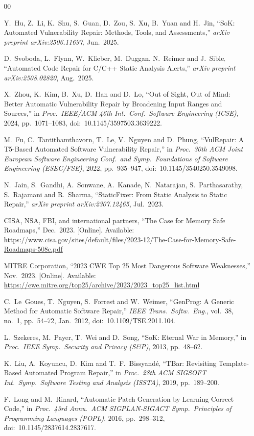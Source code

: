 \documentclass[conference]{IEEEtran}
\begin{document}
\begin{thebibliography}{00}

Y.~Hu, Z.~Li, K.~Shu, S.~Guan, D.~Zou, S.~Xu, B.~Yuan and H.~Jin,
``SoK: Automated Vulnerability Repair: Methods, Tools, and Assessments,''
\textit{arXiv preprint arXiv:2506.11697}, Jun.\ 2025.

D.~Svoboda, L.~Flynn, W.~Klieber, M.~Duggan, N.~Reimer and J.~Sible,
``Automated Code Repair for C/C++ Static Analysis Alerts,''
\textit{arXiv preprint arXiv:2508.02820}, Aug.\ 2025.

X.~Zhou, K.~Kim, B.~Xu, D.~Han and D.~Lo,
``Out of Sight, Out of Mind: Better Automatic Vulnerability Repair by Broadening
Input Ranges and Sources,''
in \textit{Proc.\ IEEE/ACM 46th Int.\ Conf.\ Software Engineering (ICSE)}, 2024,
pp.~1071--1083, doi:~10.1145/3597503.3639222.

M.~Fu, C.~Tantithamthavorn, T.~Le, V.~Nguyen and D.~Phung,
``VulRepair: A T5-Based Automated Software Vulnerability Repair,''
in \textit{Proc.\ 30th ACM Joint European Software Engineering Conf.\ and
Symp.\ Foundations of Software Engineering (ESEC/FSE)}, 2022,
pp.~935--947, doi:~10.1145/3540250.3549098.

N.~Jain, S.~Gandhi, A.~Sonwane, A.~Kanade, N.~Natarajan,
S.~Parthasarathy, S.~Rajamani and R.~Sharma,
``StaticFixer: From Static Analysis to Static Repair,''
\textit{arXiv preprint arXiv:2307.12465}, Jul.\ 2023.

CISA, NSA, FBI, and international partners,
``The Case for Memory Safe Roadmaps,'' Dec.\ 2023. [Online].
Available: \url{https://www.cisa.gov/sites/default/files/2023-12/The-Case-for-Memory-Safe-Roadmaps-508c.pdf}

MITRE Corporation,
``2023 CWE Top 25 Most Dangerous Software Weaknesses,'' Nov.\ 2023. [Online].
Available: \url{https://cwe.mitre.org/top25/archive/2023/2023_top25_list.html}

C.~Le~Goues, T.~Nguyen, S.~Forrest and W.~Weimer,
``GenProg: A Generic Method for Automatic Software Repair,''
\textit{IEEE Trans.\ Softw.\ Eng.}, vol.~38, no.~1, pp.~54--72, Jan.\ 2012,
doi:~10.1109/TSE.2011.104.

L.~Szekeres, M.~Payer, T.~Wei and D.~Song,
``SoK: Eternal War in Memory,''
in \textit{Proc.\ IEEE Symp.\ Security and Privacy (S\&P)}, 2013,
pp.~48--62.

K.~Liu, A.~Koyuncu, D.~Kim and T.~F.~Bissyand\'{e},
``TBar: Revisiting Template-Based Automated Program Repair,''
in \textit{Proc.\ 28th ACM SIGSOFT Int.\ Symp.\ Software Testing
and Analysis (ISSTA)}, 2019, pp.~189--200.

F.~Long and M.~Rinard,
``Automatic Patch Generation by Learning Correct Code,''
in \textit{Proc.\ 43rd Annu.\ ACM SIGPLAN-SIGACT Symp.\ Principles of
Programming Languages (POPL)}, 2016, pp.~298--312,
doi:~10.1145/2837614.2837617.

\end{thebibliography}
\end{document}
